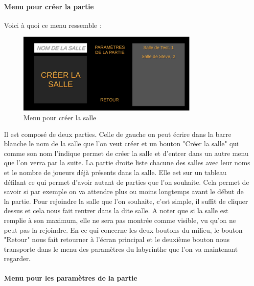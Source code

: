 \documentclass{article}
\begin{document}
\paragraph{Menu pour créer la partie}

Voici à quoi ce menu ressemble : 

\begin{figure}[!ht]
    \centering
    \includegraphics[width=0.8\textwidth]{Menu1.png}
    \caption{Menu pour créer la salle}
    \label{Menu pour créer la salle}
\end{figure}

Il est composé de deux parties. Celle de gauche on peut écrire dans la barre blanche le nom de la salle que l'on veut créer et un bouton "Créer la salle" qui comme son nom l'indique permet de créer la salle et d'entrer dans un autre menu que l'on verra par la suite. La partie droite liste chacune des salles avec leur noms et le nombre de joueurs déjà présents dans la salle. Elle est sur un tableau défilant ce qui permet d'avoir autant de parties que l'on souhaite. Cela permet de savoir si par exemple on va attendre plus ou moins longtemps avant le début de la partie. Pour rejoindre la salle que l'on souhaite, c'est simple, il suffit de cliquer dessus et cela nous fait rentrer dans la dite salle. A noter que si la salle est remplie à son maximum, elle ne sera pas montrée comme visible, vu qu'on ne peut pas la rejoindre. En ce qui concerne les deux boutons du milieu, le bouton "Retour" nous fait retourner à l'écran principal et le deuxième bouton nous transporte dans le menu des paramètres du labyrinthe que l'on va maintenant regarder.

\paragraph{Menu pour les paramètres de la partie}
\end{document}
